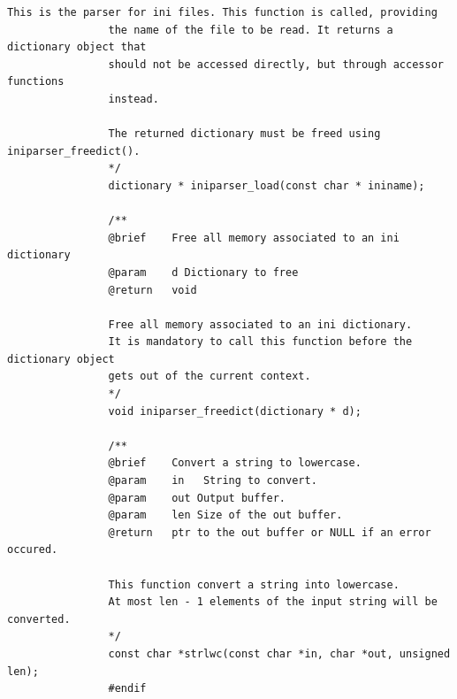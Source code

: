 \documentclass{article}
\begin{document}
\begin{Verbatim}[gobble=8]
                This is the parser for ini files. This function is called, providing
                the name of the file to be read. It returns a dictionary object that
                should not be accessed directly, but through accessor functions
                instead.
                
                The returned dictionary must be freed using iniparser_freedict().
                */
                dictionary * iniparser_load(const char * ininame);
                
                /**
                @brief    Free all memory associated to an ini dictionary
                @param    d Dictionary to free
                @return   void
                
                Free all memory associated to an ini dictionary.
                It is mandatory to call this function before the dictionary object
                gets out of the current context.
                */
                void iniparser_freedict(dictionary * d);
                
                /**
                @brief    Convert a string to lowercase.
                @param    in   String to convert.
                @param    out Output buffer.
                @param    len Size of the out buffer.
                @return   ptr to the out buffer or NULL if an error occured.
                
                This function convert a string into lowercase.
                At most len - 1 elements of the input string will be converted.
                */
                const char *strlwc(const char *in, char *out, unsigned len);
                #endif             
            \end{Verbatim}
\end{document}
